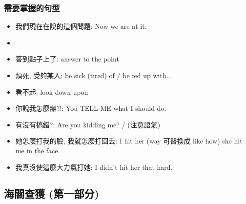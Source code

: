 \subsubsection*{需要掌握的句型}
\begin{itemize}
  \itemsep0em
  \item 我們現在在說的這個問題: Now we are at it.
  \item {}
  \item 答到點子上了: answer to the point
  \item 煩死, 受夠某人: be sick (tired) of / be fed up with...
  \item 看不起: look down upon
  \item 你說我怎麼辦?!: You TELL ME what I should do.
  \item 有沒有搞錯?: Are you kidding me? /  (注意語氣)
  \item 她怎麼打我的臉, 我就怎麼打回去: I hit her  (way 可替換成 like how) she hit me in the face.
  \item 我真沒使這麼大力氣打她: I didn't hit her that hard.
\end{itemize}

\subsection{海關查獲 (第一部分)}

